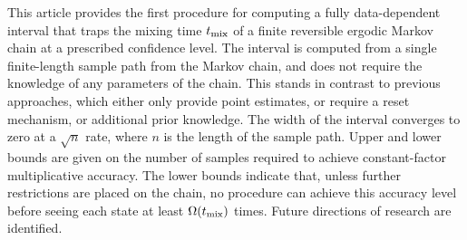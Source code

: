 This article provides the first procedure for computing a fully
data-dependent interval that traps the mixing time $t_{\operatorname{mix}}$ of a finite
reversible ergodic Markov chain at a prescribed confidence level.
The interval is computed from a single finite-length sample
path from the Markov chain, and does not require the 
knowledge of any parameters of the chain.
This stands in contrast to previous approaches, which either 
only provide point estimates, or require a
reset mechanism, or additional prior knowledge.
The width of the interval converges to zero at a
$\sqrt{n}$ rate, where $n$ is the length of the sample path.
Upper and lower bounds are given on the number of samples required to
achieve constant-factor multiplicative accuracy.
The lower bounds indicate that, unless further restrictions are placed
on the chain, no procedure can achieve this accuracy level before
seeing each state at least $\Omega(t_{\operatorname{mix}})$ times.
Future directions of research are identified.


%
%
